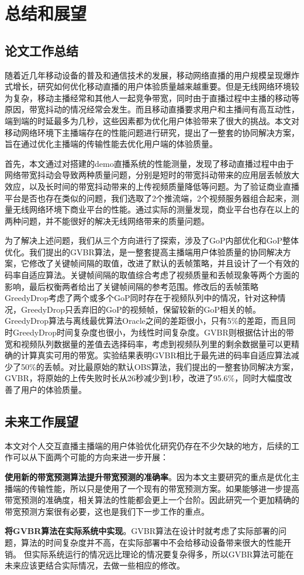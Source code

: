 \chapter{总结和展望}
\section{论文工作总结}
随着近几年移动设备的普及和通信技术的发展，移动网络直播的用户规模呈现爆炸式增长，研究如何优化移动直播的用户体验质量越来越重要。但是无线网络环境较为复杂，移动主播经常和其他人一起竞争带宽，同时由于直播过程中主播的移动等原因，带宽抖动的情况经常会发生。而且移动直播要求用户和主播间有高互动性，端到端的时延最多为几秒，这些因素都为优化用户体验带来了很大的挑战。本文对移动网络环境下主播端存在的性能问题进行研究，提出了一整套的协同解决方案，旨在通过优化主播端的传输性能去优化用户端的体验质量。

首先，本文通过对搭建的demo直播系统的性能测量，发现了移动直播过程中由于网络带宽抖动会导致两种质量问题，分别是短时的带宽抖动带来的应用层丢帧放大效应，以及长时间的带宽抖动带来的上传视频质量降低等问题。为了验证商业直播平台是否也存在类似的问题，我们选取了2个推流端，2个视频服务器组合起来，测量无线网络环境下商业平台的性能。通过实际的测量发现，商业平台也存在以上的两种问题，并不能很好的解决无线网络带来的质量问题。

为了解决上述问题，我们从三个方向进行了探索，涉及了GoP内部优化和GoP整体优化。我们提出的GVBR算法，是一整套提高主播端用户体验质量的协同解决方案，它修改了关键帧间隔的取值，改进了默认的丢帧策略，并且设计了一个有效的码率自适应算法。关键帧间隔的取值综合考虑了视频质量和丢帧现象等两个方面的影响，最后权衡两者给出了关键帧间隔的参考范围。修改后的丢帧策略GreedyDrop考虑了两个或多个GoP同时存在于视频队列中的情况，针对这种情况，GreedyDrop只丢弃旧的GoP的视频帧，保留较新的GoP相关的帧。GreedyDrop算法与离线最优算法Oracle之间的差距很小，只有5\%的差距，而且同时GreedyDrop时间复杂度也很小，为线性时间复杂度。GVBR则根据估计出的带宽和视频队列数据量的差值去选择码率，考虑到视频队列里的剩余数据量可以更精确的计算真实可用的带宽。实验结果表明GVBR相比于最先进的码率自适应算法减少了50\%的丢帧。对比最原始的默认OBS算法，我们提出的一整套协同解决方案，GVBR，将原始的上传失败时长从26秒减少到1秒，改进了95.6\%，同时大幅度改善了用户的体验质量。

\section{未来工作展望}
本文对个人交互直播主播端的用户体验优化研究仍存在不少欠缺的地方，后续的工作可以从下面两个可能的方向来进一步开展：

\textbf{使用新的带宽预测算法提升带宽预测的准确率}。因为本文主要研究的重点是优化主播端的传输性能，所以只是使用了一个现有的带宽预测方案。如果能够进一步提高带宽预测的准确度，相关算法的性能都会更上一个台阶。因此研究一个更加精确的带宽预测方案很有必要，这也是我们下一步工作的重点。

\textbf{将GVBR算法在实际系统中实现}。GVBR算法在设计时就考虑了实际部署的问题，算法的时间复杂度并不高，在实际部署中不会给移动设备带来很大的性能开销。 但实际系统运行的情况远比理论的情况要复杂得多，所以GVBR算法可能在未来应该更结合实际情况，去做一些相应的修改。